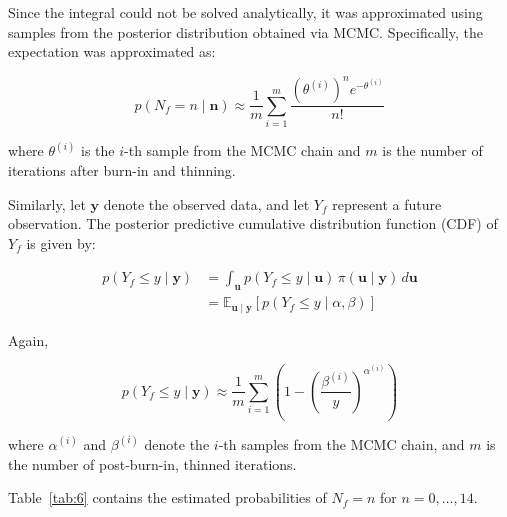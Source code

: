 \documentclass{Class/julia}
\begin{document}
Since the integral could not be solved analytically, it was approximated using samples from the posterior distribution obtained via MCMC. Specifically, the expectation was approximated as:

\begin{equation}\label{eq:1}
p (N_f = n \mid \mathbf{n}) \approx \frac{1}{m} \sum_{i=1}^{m} \frac{(\theta^{(i)})^n e^{-\theta^{(i)}}}{n!}
\end{equation}

where \( \theta^{(i)} \) is the \( i \)-th sample from the MCMC chain and \( m \) is the number of iterations after burn-in and thinning.

Similarly, let \( \mathbf{y} \) denote the observed data, and let \( Y_f \) represent a future observation. The posterior predictive cumulative distribution function (CDF) of \( Y_f \) is given by:

\[
\begin{aligned}
p (Y_f \leq y \mid \mathbf{y}) 
&= \int_{\mathbf{u}} p(Y_f \leq y \mid \mathbf{u}) \, \pi(\mathbf{u} \mid \mathbf{y}) \, d\mathbf{u} \\
&= \mathbb{E}_{\mathbf{u} \mid \mathbf{y}}\left[ p(Y_f \leq y \mid \alpha, \beta) \right]
\end{aligned}
\]

Again,

\begin{equation}\label{eq:2}
p (Y_f \leq y \mid \mathbf{y}) \approx \frac{1}{m} \sum_{i=1}^{m} \left( 1 - \left( \frac{\beta^{(i)}}{y} \right)^{\alpha^{(i)}} \right)
\end{equation}

\noindent where \( \alpha^{(i)} \) and \( \beta^{(i)} \) denote the \( i \)-th samples from the MCMC chain, and \( m \) is the number of post-burn-in, thinned iterations.

Table~\ref{tab:6} contains the estimated probabilities of \( N_f = n \) for \( n = 0, \dots, 14 \).
\end{document}
